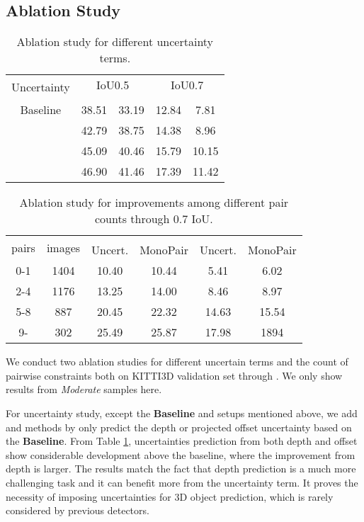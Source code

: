 \documentclass[10pt,twocolumn,letterpaper]{article}
\begin{document}
\subsection{Ablation Study}
\begin{table}[!t]
		\centering
		\renewcommand\arraystretch{1.0}
		\renewcommand{\tabcolsep}{3pt}
		\begin{tabular}{c|cc|cc}
			\hline
			\multirow{2}{*}{Uncertainty}&  \multicolumn{2}{c|}{ IoU0.5} & \multicolumn{2}{c}{ IoU0.7} \\
			\cline{2-5}
			&  &  &   &   \\
			\hline
			Baseline & 38.51 & 33.19 & 12.84 & 7.81 \\
			 & 42.79 & 38.75 & 14.38 &  8.96 \\
			 & 45.09 & 40.46 & 15.79 & 10.15 \\
			 & 46.90 & 41.46 & 17.39 & 11.42 \\
			\hline
		\end{tabular}
	\caption{Ablation study for different uncertainty terms.}
	\label{tab:ap40_dv_cv}
\end{table}


\begin{table}[!t]
		\centering
		\renewcommand\arraystretch{1.0}
		\renewcommand{\tabcolsep}{3pt}
		\begin{tabular}{c|c|cc|cc}
			\hline
			\multirow{2}{*}{pairs}&\multirow{2}{*}{images}&  \multicolumn{2}{c|}{} & \multicolumn{2}{c}{} \\
			\cline{3-6}
			& & Uncert.  & MonoPair & Uncert.  & MonoPair  \\
			\hline
			0-1 & 1404 & 10.40 & 10.44 & 5.41 &6.02 \\
			2-4 & 1176 & 13.25 & 14.00 & 8.46 &8.97 \\
			5-8 & 887 & 20.45 & 22.32 & 14.63 &15.54 \\
			9- & 302 & 25.49 & 25.87 & 17.98 &1894 \\
			\hline
		\end{tabular}
\caption{Ablation study for improvements among different pair counts through 0.7 IoU.}
	\label{tab:ap40_min_max_pair}
\end{table}




We conduct two ablation studies for different uncertain terms and the count of pairwise constraints both on KITTI3D validation set through . We only show results from \textit{Moderate} samples here.

For uncertainty study, except the \textbf{Baseline} and \textbf{} setups mentioned above, we add \textbf{} and \textbf{} methods by only predict the depth or projected offset uncertainty based on the \textbf{Baseline}.
From Table \ref{tab:ap40_dv_cv}, uncertainties prediction from both depth and offset show considerable development above the baseline, where the improvement from depth is larger. The results match the fact that depth prediction is a much more challenging task and it can benefit more from the uncertainty term.
It proves the necessity of imposing uncertainties for 3D object prediction, which is rarely considered by previous detectors.
\end{document}
